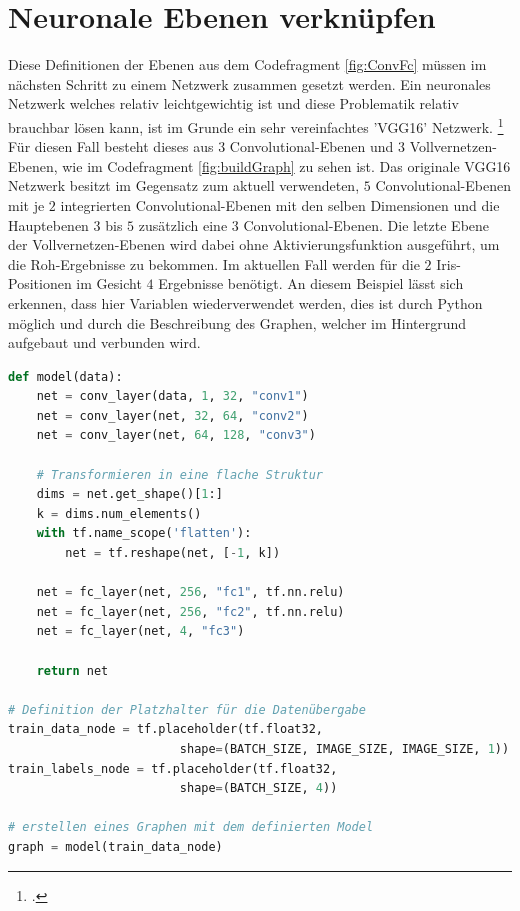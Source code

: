 \section{Neuronale Ebenen verknüpfen}

Diese Definitionen der Ebenen aus dem Codefragment \ref{fig:ConvFc} müssen im nächsten Schritt zu einem Netzwerk zusammen gesetzt werden. 
Ein neuronales Netzwerk welches relativ leichtgewichtig ist und diese Problematik relativ brauchbar lösen kann, ist im Grunde ein sehr vereinfachtes 'VGG16' Netzwerk. \footcite{VGG16: https://arxiv.org/pdf/1409.1556.pdf}
Für diesen Fall besteht dieses aus $3$ Convolutional-Ebenen und $3$ Vollvernetzen-Ebenen, wie im Codefragment \ref{fig:buildGraph} zu sehen ist. 
Das originale VGG16 Netzwerk besitzt im Gegensatz zum aktuell verwendeten, $5$ Convolutional-Ebenen mit je $2$ integrierten Convolutional-Ebenen mit den selben Dimensionen und die Hauptebenen $3$ bis $5$ zusätzlich eine $3$ Convolutional-Ebenen. 
Die letzte Ebene der Vollvernetzen-Ebenen wird dabei ohne Aktivierungsfunktion ausgeführt, um die Roh-Ergebnisse zu bekommen. 
Im aktuellen Fall werden für die $2$ Iris-Positionen im Gesicht $4$ Ergebnisse benötigt. 
An diesem Beispiel lässt sich erkennen, dass hier Variablen wiederverwendet werden, dies ist durch Python möglich und durch die Beschreibung des Graphen, welcher im Hintergrund aufgebaut und verbunden wird. 
\begin{lstlisting}[caption={Modeldefinition des Graphen},label=fig:buildGraph,captionpos=b,language=Python]
def model(data):
    net = conv_layer(data, 1, 32, "conv1")
    net = conv_layer(net, 32, 64, "conv2")
    net = conv_layer(net, 64, 128, "conv3")

    # Transformieren in eine flache Struktur
    dims = net.get_shape()[1:]
    k = dims.num_elements()
    with tf.name_scope('flatten'):
        net = tf.reshape(net, [-1, k])
    
    net = fc_layer(net, 256, "fc1", tf.nn.relu)    
    net = fc_layer(net, 256, "fc2", tf.nn.relu)
    net = fc_layer(net, 4, "fc3")
    
    return net
    
# Definition der Platzhalter für die Datenübergabe
train_data_node = tf.placeholder(tf.float32, 
						shape=(BATCH_SIZE, IMAGE_SIZE, IMAGE_SIZE, 1))
train_labels_node = tf.placeholder(tf.float32, 
						shape=(BATCH_SIZE, 4))

# erstellen eines Graphen mit dem definierten Model
graph = model(train_data_node)
\end{lstlisting}

